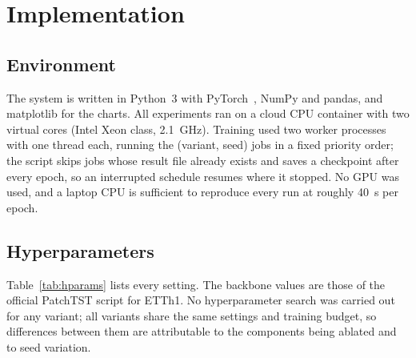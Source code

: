 \section{Implementation}
\label{sec:impl}

\subsection{Environment}

The system is written in Python~3 with PyTorch~\cite{pytorch}, NumPy and pandas, and matplotlib for the charts. All experiments ran on a cloud CPU container with two virtual cores (Intel Xeon class, 2.1~GHz). Training used two worker processes with one thread each, running the (variant, seed) jobs in a fixed priority order; the script skips jobs whose result file already exists and saves a checkpoint after every epoch, so an interrupted schedule resumes where it stopped. No GPU was used, and a laptop CPU is sufficient to reproduce every run at roughly 40~s per epoch.

\subsection{Hyperparameters}

Table~\ref{tab:hparams} lists every setting. The backbone values are those of the official PatchTST script for ETTh1. No hyperparameter search was carried out for any variant; all variants share the same settings and training budget, so differences between them are attributable to the components being ablated and to seed variation.

\begin{table}[!t]
\centering
\caption{Hyperparameters (Identical for All Variants)}
\label{tab:hparams}
\footnotesize
{}
\end{table}

